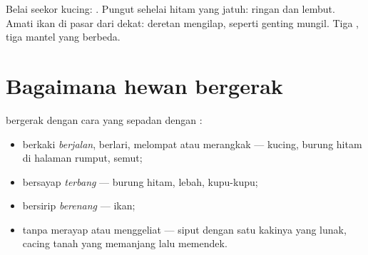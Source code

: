 \begin{example}\label{ex:g1:animals-around-us:covering}
Belai seekor kucing: . Pungut sehelai  hitam yang
jatuh: ringan dan lembut. Amati ikan di pasar dari dekat: deretan
 mengilap, seperti genting mungil. Tiga , tiga mantel yang
berbeda.
\end{example}

\section{Bagaimana hewan bergerak}

\begin{proposition}\label{prop:g1:animals-around-us:moving}
 bergerak dengan cara yang sepadan dengan :
\begin{itemize}
  \item {} berkaki \emph{berjalan}, berlari, melompat atau merangkak
        --- kucing, burung hitam di halaman rumput, semut;
  \item {} bersayap \emph{terbang} --- burung hitam,
        lebah, kupu-kupu;
  \item {} bersirip \emph{berenang} --- ikan;
  \item {} tanpa  merayap atau menggeliat --- siput
        dengan satu kakinya yang lunak, cacing tanah yang memanjang
        lalu memendek.
\end{itemize}
\end{proposition}
\admitted

